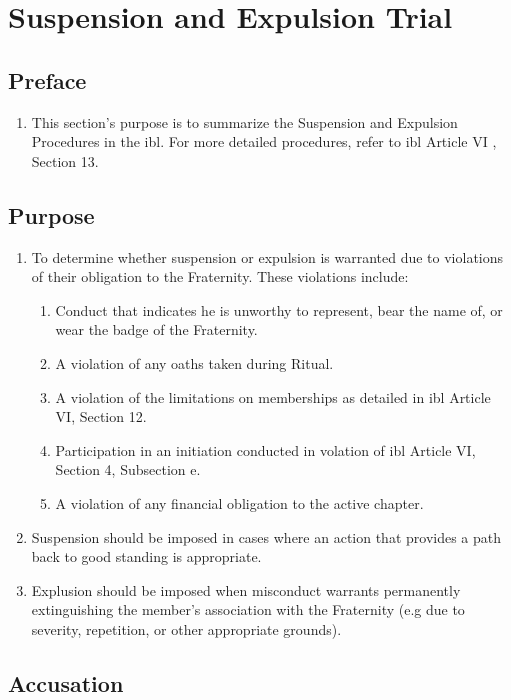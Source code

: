 \chapter{Suspension and Expulsion Trial}
\label{sus-exp-trial}

\section{Preface}
	\begin{enumerate}
		\item This section's purpose is to summarize the Suspension and Expulsion Procedures in the \gls{ibl}. For more detailed procedures, refer to \gls{ibl} Article VI , Section 13.
	\end{enumerate}

\section{Purpose}

	\begin{enumerate}
		\item To determine whether suspension or expulsion is warranted due to violations of their obligation to the Fraternity. These violations include:
			\begin{enumerate}
				\item Conduct that indicates he is unworthy to represent, bear the name of, or wear the badge of the Fraternity.
				\item A violation of any oaths taken during Ritual.
				\item A violation of the limitations on memberships as detailed in \gls{ibl} Article VI, Section 12.
				\item Participation in an initiation conducted in volation of \gls{ibl} Article VI, Section 4, Subsection e.
				\item A violation of any financial obligation to the active chapter.
			\end{enumerate}
		\item Suspension should be imposed in cases where an action that provides a path back to good standing is appropriate.
		\item Explusion should be imposed when misconduct warrants permanently extinguishing the member's association with the Fraternity (e.g due to severity, repetition, or other appropriate grounds).
	\end{enumerate}

\section{Accusation}

